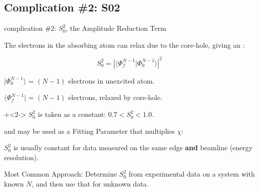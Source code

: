 \subsection{{\feff} Complication \#2: S02}
\begin{slide}{{\feff} complication \#2: $S_0^2$, the  Amplitude Reduction Term}

  \begin{cenpage}{135mm}

  \vmm
  The {} electrons in the absorbing atom can relax due to
  the core-hole, giving an {}:

   \vmm
   \[
   S_0^2 =  {  |{\langle \Phi^{N-1}_f |\Phi^{N-1}_0 \rangle}|^2}
   \]

    \vspace{1mm}

    ${| \Phi^{N-1}_0 \rangle }$ = $(N-1)$ electrons in unexcited atom.

    ${\langle \Phi^{N-1}_f|}$   = $(N-1)$ electrons, relaxed by core-hole.

    \vmm

    \onslide+<2->
    ${S_0^2}$ is taken as a constant: \hspace{3mm}  $ 0.7 < S_0^2 < 1.0 $.

    and may be used as a Fitting Parameter that multiplies {$\chi$}:

    \vmm \vmm
    \begin{center}
      {}
    \end{center}


    \begin{postitbox}{68mm}
      $S_0^2$ is usually constant for  data measured on
      the same edge {\bf{and}} beamline (energy resolution).
    \end{postitbox}

    Most Common Approach: Determine $S_0^2$ from experimental data on a
    system with known $N$, and then use that for unknown data.

    \vmm

  \end{cenpage}  \end{slide}
